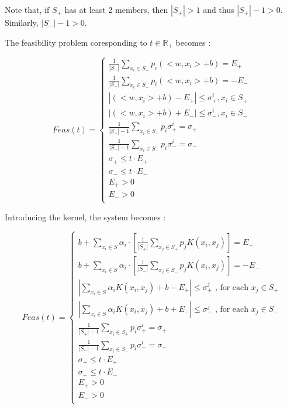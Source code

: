\documentclass[a4paper,twoside,10pt]{report}
\begin{document}
	Note that, if \(S_+\) has at least 2 members, then \(|S_+| > 1\) and thus \(|S_+| - 1 > 0\). Similarly, \(|S_-| - 1 > 0\).
	
	The feasibility problem coresponding to \(t\in\mathbb{R}_+\) becomes :
	
	\[
		Feas(t) = \left\{
		\begin{array}{l}			
				\frac{1}{|S_+|} \sum_{x_i\in S_+} {p_i(<w,x_i> + b)} = {E_+}\\
				\frac{1}{|S_-|} \sum_{x_i\in S_-} {p_i(<w,x_i> + b)} = -{E_-}\\
				
				|(<w,x_i> + b) - E_+| \leq \sigma_+^i, x_i\in S_+\\
				|(<w,x_i> + b) + E_-| \leq \sigma_-^i, x_i\in S_-\\
				
				\frac{1}{|S_+| - 1} \sum_{x_i\in S_+} {p_i \sigma_+^i} = {\sigma_+} \\ %
				\frac{1}{|S_-| - 1} \sum_{x_i\in S_-} {p_i \sigma_-^i} = {\sigma_-} \\ %
				
				\sigma_+ \leq t \cdot E_+\\
				\sigma_- \leq t \cdot E_-\\
				E_+ > 0\\
				E_- > 0\\
		\end{array}
		\right. \label{feas__weight_0}
	\]
	
	Introducing the kernel, the system becomes : 
	
	\[
		Feas(t) = \left\{
		\begin{array}{l}			
				b + \sum_{x_i\in S} {\alpha_i \cdot [\frac{1}{|S_+|}\sum_{x_j\in S_+} {p_j K(x_i, x_j)}]} = E_+\\
				b + \sum_{x_i\in S} {\alpha_i \cdot [\frac{1}{|S_-|}\sum_{x_j\in S_-} {p_j K(x_i, x_j)}]} = -E_-\\
				
				|\sum_{x_i\in S} {\alpha_i K(x_i, x_j)} + b - E_+| \leq \sigma^j_+ \mbox{ , for each } x_j \in S_+\\
				|\sum_{x_i\in S} {\alpha_i K(x_i, x_j)} + b + E_-| \leq \sigma^j_- \mbox{ , for each } x_j \in S_-\\
					
				\frac{1}{|S_+| - 1} \sum_{x_i\in S_+} {p_i \sigma_+^i} = {\sigma_+} \\
				\frac{1}{|S_-| - 1} \sum_{x_i\in S_-} {p_i \sigma_-^i} = {\sigma_-} \\
				
				\sigma_+ \leq t \cdot E_+\\
				\sigma_- \leq t \cdot E_-\\
				E_+ > 0\\
				E_- > 0\\
		\end{array}
		\right. \label{feas_weight_1}
	\]	
\end{document}
